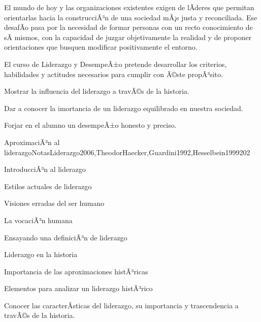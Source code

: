 \begin{syllabus}


\begin{justification}
El mundo de hoy y las organizaciones existentes exigen de lÃ­deres que permitan orientarlas hacia la construcciÃ³n de una sociedad mÃ¡s justa y reconciliada.  Ese desafÃ­o pasa por la necesidad de formar personas con un recto conocimiento de sÃ­ mismos, con la capacidad de juzgar objetivamente la realidad y de proponer orientaciones que busquen modificar positivamente el entorno.

El curso de Liderazgo y DesempeÃ±o pretende desarrollar los criterios, habilidades y actitudes necesarios para cumplir con Ã©ste propÃ³sito.
\end{justification}

\begin{goals}
\item \OutcomeHU
\item Mostrar la influencia del liderazgo a travÃ©s de la historia.
\item Dar a conocer la imortancia de un liderazgo equilibrado en nuestra sociedad.
\item Forjar en el alumno un desempeÃ±o honesto y preciso.
\end{goals}

\begin{outcomes}
\end{outcomes}

\begin{unit}{AproximaciÃ³n al liderazgo}{NotasLiderazgo2006,TheodorHaecker,Guardini1992,Hesselbein1999}{20}{2}
\begin{topics}
	\item IntroducciÃ³n al liderazgo
	\item Estilos actuales de liderazgo
	\item Visiones erradas del ser humano
	\item La vocaciÃ³n humana
	\item Ensayando una definiciÃ³n de liderazgo
	\item Liderazgo en la historia
	\item Importancia de las aproximaciones histÃ³ricas
	\item Elementos para analizar un liderazgo histÃ³rico
\end{topics}
\begin{unitgoals}
	\item Conocer las caracterÃ­sticas del liderazgo, su importancia y trascendencia a travÃ©s de la historia.
\end{unitgoals}
\end{unit}


\end{syllabus}
